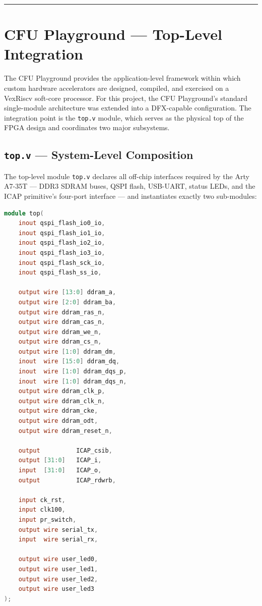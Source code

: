 \vspace{0.4em}\hrule\vspace{0.4em}

\section{CFU Playground — Top-Level Integration}

The CFU Playground provides the application-level framework within which custom hardware accelerators are designed, compiled, and exercised on a VexRiscv soft-core processor. For this project, the CFU Playground's standard single-module architecture was extended into a DFX-capable configuration. The integration point is the \texttt{top.v} module, which serves as the physical top of the FPGA design and coordinates two major subsystems.

\subsection{\texttt{top.v} — System-Level Composition}

The top-level module \texttt{top.v} declares all off-chip interfaces required by the Arty A7-35T — DDR3 SDRAM buses, QSPI flash, USB-UART, status LEDs, and the ICAP primitive's four-port interface — and instantiates exactly two sub-modules:

\begin{lstlisting}[style=mystyle, language=Verilog]
module top(
    inout qspi_flash_io0_io,
    inout qspi_flash_io1_io,
    inout qspi_flash_io2_io,
    inout qspi_flash_io3_io,
    inout qspi_flash_sck_io,
    inout qspi_flash_ss_io,

    output wire [13:0] ddram_a,
    output wire [2:0] ddram_ba,
    output wire ddram_ras_n,
    output wire ddram_cas_n,
    output wire ddram_we_n,
    output wire ddram_cs_n,
    output wire [1:0] ddram_dm,
    inout  wire [15:0] ddram_dq,
    inout  wire [1:0] ddram_dqs_p,
    inout  wire [1:0] ddram_dqs_n,
    output wire ddram_clk_p,
    output wire ddram_clk_n,
    output wire ddram_cke,
    output wire ddram_odt,
    output wire ddram_reset_n,

    output          ICAP_csib,
    output [31:0]   ICAP_i,
    input  [31:0]   ICAP_o,
    output          ICAP_rdwrb,

    input ck_rst,
    input clk100,
    input pr_switch,
    output wire serial_tx,
    input  wire serial_rx,

    output wire user_led0,
    output wire user_led1,
    output wire user_led2,
    output wire user_led3
);
\end{lstlisting}

